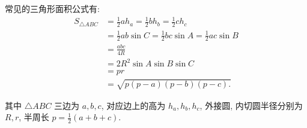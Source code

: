 \documentclass{March}
\begin{document}
\begin{note}
	常见的三角形面积公式有:
	$$
		\begin{aligned}
			S_{\triangle A B C} & =\frac{1}{2} a h_a=\frac{1}{2} b h_b=\frac{1}{2} c h_c                \\
			                    & =\frac{1}{2} a b \sin C=\frac{1}{2} b c \sin A=\frac{1}{2} a c \sin B \\
			                    & =\frac{a b c}{4 R}                                                    \\
			                    & =2 R^2 \sin A \sin B \sin C                                           \\
			                    & =p r                                                                  \\
			                    & =\sqrt{p(p-a)(p-b)(p-c) .}
		\end{aligned}
	$$

	其中 $\triangle A B C$ 三边为 $a ,  b ,  c$, 对应边上的高为 $h_a ,  h_b ,  h_c$, 外接圆, 内切圆半径分别为 $R ,  r$, 半周长 $p=\frac{1}{2}(a+b+c)$.
\end{note}
\end{document}
